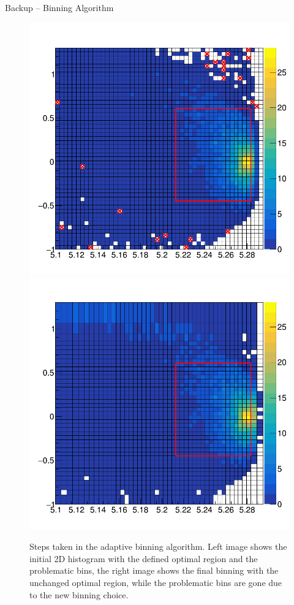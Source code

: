 \documentclass[serif]{beamer}
\begin{document}
\begin{frame}[t]{Backup -- Binning Algorithm}
\vspace{-3mm}
\small
\begin{figure}[H]
	\centering
	\includegraphics[width=0.49\linewidth]{fig/adaptive_1}
	\includegraphics[width=0.49\linewidth]{fig/adaptive_15}
	\caption{Steps taken in the adaptive binning algorithm. Left image shows the initial 2D histogram with the defined optimal region and the problematic bins, the right image shows the final binning with the unchanged optimal region, while the problematic bins are gone due to the new binning choice.}
\end{figure}
\end{frame}
\end{document}
